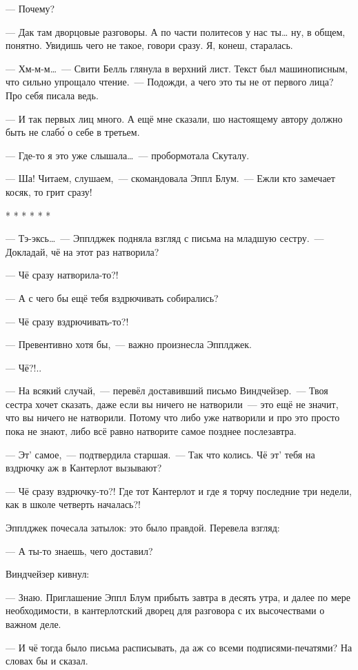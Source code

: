 \documentclass[fontsize=11pt,a5paper,titlepage=firstcover]{scrbook}
\begin{document}
--- Почему?

--- Дак там дворцовые разговоры. А по части политесов у нас ты{\ldots} ну, в общем, понятно. Увидишь чего не такое, говори сразу. Я, конеш, старалась.

--- Хм-м-м{\ldots}~--- Свити Белль глянула в верхний лист. Текст был машинописным, что сильно упрощало чтение.~--- Подожди, а чего это ты не от первого лица? Про себя писала ведь.

--- И так первых лиц много. А ещё мне сказали, шо настоящему автору должно быть не слабо́ о себе в третьем.

--- Где-то я это уже слышала{\ldots}~--- пробормотала Скуталу.

--- Ша! Читаем, слушаем,~--- скомандовала Эппл Блум.~--- Ежли кто замечает косяк, то грит сразу!
\begin{center}* * * * * *\end{center}

--- Тэ-эксь{\ldots}~--- Эпплджек подняла взгляд с письма на младшую сестру.~--- Докладай, чё на этот раз натворила?

--- Чё сразу натворила-то?!

--- А с чего бы ещё тебя вздрючивать собирались?

--- Чё сразу вздрючивать-то?!

--- Превентивно хотя бы,~--- важно произнесла Эпплджек.

--- Чё?!..

--- На всякий случай,~--- перевёл доставивший письмо Винд\-чей\-зер.~--- Твоя сестра хочет сказать, даже если вы ничего не натворили~--- это ещё не значит, что вы ничего не натворили. Потому что либо уже натворили и про это просто пока не знают, либо всё равно натворите самое позднее послезавтра.

--- Эт’ самое,~--- подтвердила старшая.~--- Так что колись. Чё эт’ тебя на вздрючку аж в Кантерлот вызывают?

--- Чё сразу вздрючку-то?! Где тот Кантерлот и где я торчу последние три недели, как в школе четверть началась?!

Эпплджек почесала затылок: это было правдой. Перевела взгляд:

--- А ты-то знаешь, чего доставил?

Виндчейзер кивнул:

--- Знаю. Приглашение Эппл Блум прибыть завтра в десять утра, и далее по мере необходимости, в кантерлотский дворец для разговора с их высочествами о важном деле.

--- И чё тогда было письма расписывать, да аж со всеми подписями-печатями? На словах бы и сказал.
\end{document}
